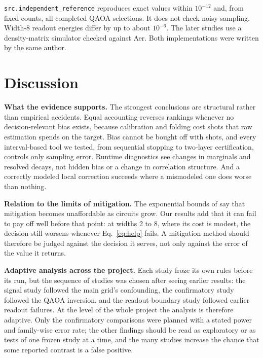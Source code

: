 \documentclass[10pt,twocolumn]{article}
\newcommand{\paragraphlead}[1]{\textbf{#1}\quad}
\begin{document}
\texttt{src.independent\_reference} reproduces exact values within $10^{-12}$ and, from fixed
counts, all completed QAOA selections. It does not check noisy sampling. Width-8 readout energies
differ by up to about $10^{-6}$. The later studies use a density-matrix simulator checked against
Aer. Both implementations were written by the same author.

\section{Discussion}
\paragraphlead{What the evidence supports.}
The strongest conclusions are structural rather than empirical accidents. Equal accounting reverses
rankings whenever no decision-relevant bias exists, because calibration and folding cost shots that
raw estimation spends on the target. Bias cannot be bought off with shots, and every
interval-based tool we tested, from sequential stopping to two-layer certification, controls only
sampling error. Runtime diagnostics see changes in marginals and resolved decays, not hidden bias or
a change in correlation structure. And a correctly modeled local correction succeeds where a
mismodeled one does worse than nothing.

\paragraphlead{Relation to the limits of mitigation.}
The exponential bounds of \cite{takagi2022,takagi2023,quek2024} say that mitigation becomes
unaffordable as circuits grow. Our results add that it can fail to pay off well before that point:
at widths 2 to 8, where its cost is modest, the decision still worsens whenever
Eq.~\eqref{eq:help} fails. A mitigation method should therefore be judged against the decision it
serves, not only against the error of the value it returns.

\paragraphlead{Adaptive analysis across the project.}
Each study froze its own rules before its run, but the sequence of studies was chosen after seeing
earlier results: the signal study followed the main grid's confounding, the confirmatory study
followed the QAOA inversion, and the readout-boundary study followed earlier readout failures. At
the level of the whole project the analysis is therefore adaptive. Only the confirmatory
comparisons were planned with a stated power and family-wise error rate; the other findings should be
read as exploratory or as tests of one frozen study at a time, and the many studies increase the
chance that some reported contrast is a false positive.
\end{document}
